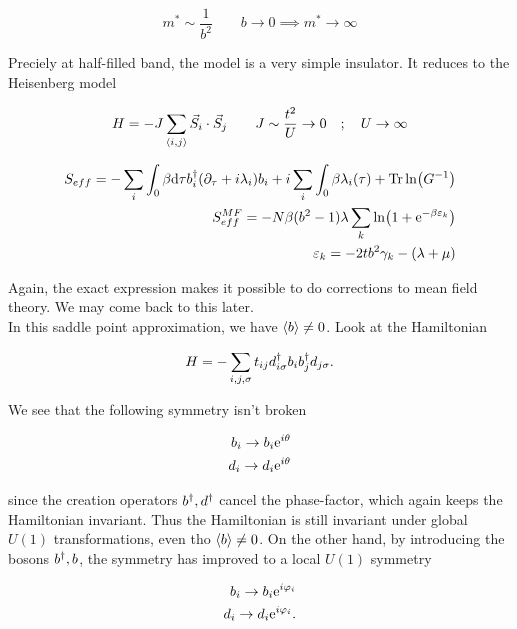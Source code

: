\begin{equation*}
    m^* \sim \frac{1}{b^2} \quad \quad b \to 0 \implies m^* \to \infty 
\end{equation*}

Preciely at half-filled band, the model is a very simple insulator. It reduces to the Heisenberg model 

\begin{align*}
    H = -J \sum_{\expval{i,j}} \Vec{S}_i \cdot \Vec{S}_j \quad \quad J \sim \frac{t^2}{U} \to 0 \quad  ; \quad U \to \infty 
\end{align*}

\begin{align*}
    S_{eff} = -\sum_i \int_{0}{\beta} \dd \tau b^{\dagger}_i (\partial_\tau + i\lambda_i)b_i + i\sum_i \int_{0}{\beta} \lambda_i(\tau) + \Tr \ln(G^{-1}) \\ 
    S_{eff}^{MF} = - N\beta (b^2 - 1)\lambda \sum_k \ln (1 + \mathrm{e}^{-\beta \varepsilon_k})  \\ 
    \varepsilon_k = -2tb^2\gamma_k - (\lambda + \mu) 
\end{align*}

Again, the exact expression makes it possible to do corrections to mean field theory. We may come back to this later. \\

In this saddle point approximation, we have $\expval{b} \neq 0$. Look at the Hamiltonian 

\begin{equation*}
    H = - \sum_{i,j,\sigma} t_{ij} d^{\dagger}_{i \sigma} b_i b^{\dagger}_j d_{j \sigma}.
\end{equation*}

We see that the following symmetry isn't broken 

\begin{align*}
    b_i \to b_i \mathrm{e}^{i\theta} \\ 
    d_i \to d_i \mathrm{e}^{i\theta} 
\end{align*}

since the creation operators $b^{\dagger}, d^{\dagger}$ cancel the phase-factor, which again keeps the Hamiltonian invariant. Thus the Hamiltonian is still invariant under global $U(1)$ transformations, even tho $\expval{b} \neq 0$. On the other hand, by introducing the bosons $b^{\dagger}, b$, the symmetry has improved to a local $U(1)$ symmetry

\begin{align*}
    b_i \to b_i \mathrm{e}^{i\varphi_i} \\ 
    d_i \to d_i \mathrm{e}^{i\varphi_i}. 
\end{align*}

